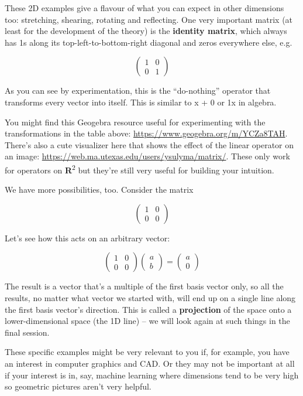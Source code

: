 \documentclass[oneside,english]{amsbook}
\numberwithin{section}{chapter}
\theoremstyle{plain}
\theoremstyle{definition}
\begin{document}
These 2D examples give a flavour of what you can expect in other
dimensions too: stretching, shearing, rotating and reflecting. One very
important matrix (at least for the development of the theory) is the
\textbf{identity matrix}, which always has 1s along its
top-left-to-bottom-right diagonal and zeros everywhere else, e.g.

\[\begin{pmatrix}
	1 & 0 \\
	0 & 1
\end{pmatrix}\]

As you can see by experimentation, this is the ``do-nothing'' operator
that transforms every vector into itself. This is similar to x + 0 or 1x
in algebra.

You might find this Geogebra resource useful for experimenting with the
transformations in the table above:
\url{https://www.geogebra.org/m/YCZa8TAH}. There's also a cute
visualizer here that shows the effect of the linear operator on an
image: \url{https://web.ma.utexas.edu/users/ysulyma/matrix/}. These only
work for operators on \textbf{R}\textsuperscript{2} but they're still
very useful for building your intuition.

We have more possibilities, too. Consider the matrix

\[\begin{pmatrix}
	1 & 0 \\
	0 & 0
\end{pmatrix}\]

Let's see how this acts on an arbitrary vector:

\[\begin{pmatrix}
	1 & 0 \\
	0 & 0
\end{pmatrix}\begin{pmatrix}
	a \\
	b
\end{pmatrix} = \begin{pmatrix}
	a \\
	0
\end{pmatrix}\]

The result is a vector that's a multiple of the first basis vector only,
so all the results, no matter what vector we started with, will end up
on a single line along the first basis vector's direction. This is
called a \textbf{projection} of the space onto a lower-dimensional space
(the 1D line) -- we will look again at such things in the final session.

These specific examples might be very relevant to you if, for example,
you have an interest in computer graphics and CAD. Or they may not be
important at all if your interest is in, say, machine learning where
dimensions tend to be very high so geometric pictures aren't very
helpful.
\end{document}
